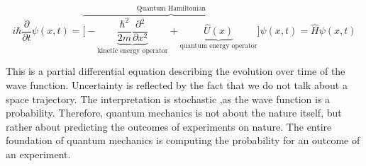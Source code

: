   $$i\hbar \frac{\partial {}}{\partial {t}}\psi(x,t) = \overbrace{\biggl[-\underbrace{\frac{\hbar^2}{2m}\frac{\partial {^2}}{\partial {x^2}}}_{\text{kinetic energy operator}}+\underbrace{\hat{U}(x)}_{\text{quantum energy operator}}\biggr]}^{\text{Quantum Hamiltonian}}\psi(x,t) = \hat{H}\psi(x,t)$$

  This is a partial differential equation describing the evolution over time of the wave function.
  Uncertainty is reflected by the fact that we do not talk about a space trajectory.
  The interpretation is stochastic ,as the wave function is a probability.
  Therefore, quantum mechanics is not about the nature itself, but rather about predicting the outcomes of experiments on nature.
  The entire foundation of quantum mechanics is computing the probability for an outcome of an experiment.
